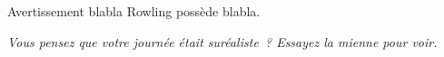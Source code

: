 Avertissement blabla Rowling possède blabla.

\emph{Vous pensez que votre journée était suréaliste~? Essayez la mienne pour voir.}

